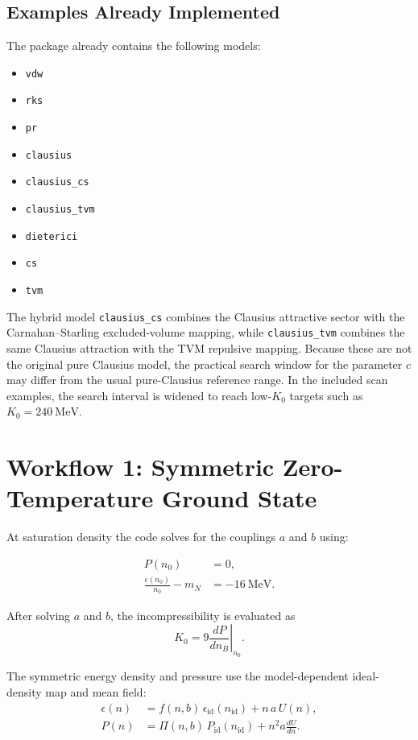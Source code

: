 \documentclass[11pt]{article}
\begin{document}
\subsection{Examples Already Implemented}

The package already contains the following models:

\begin{itemize}
\item \texttt{vdw}
\item \texttt{rks}
\item \texttt{pr}
\item \texttt{clausius}
\item \texttt{clausius\_cs}
\item \texttt{clausius\_tvm}
\item \texttt{dieterici}
\item \texttt{cs}
\item \texttt{tvm}
\end{itemize}

The hybrid model \texttt{clausius\_cs} combines the Clausius attractive sector
with the Carnahan--Starling excluded-volume mapping, while
\texttt{clausius\_tvm} combines the same Clausius attraction with the TVM
repulsive mapping.  Because these are not the original pure Clausius model,
the practical search window for the parameter $c$ may differ from the usual
pure-Clausius reference range.  In the included scan examples, the search
interval is widened to reach low-$K_0$ targets such as
$K_0=240~\mathrm{MeV}$.

\section{Workflow 1: Symmetric Zero-Temperature Ground State}

At saturation density the code solves for the couplings $a$ and $b$ using:

\begin{align}
P(n_0) &= 0, \\
\frac{\epsilon(n_0)}{n_0} - m_N &= -16~\mathrm{MeV}.
\end{align}

After solving $a$ and $b$, the incompressibility is evaluated as
\begin{equation}
K_0 = 9 \left. \frac{dP}{dn_B} \right|_{n_0}.
\end{equation}

The symmetric energy density and pressure use the model-dependent ideal-density
map and mean field:
\begin{align}
\epsilon(n) &= f(n,b)\,\epsilon_{\mathrm{id}}(n_{\mathrm{id}}) + n\,a\,U(n), \\
P(n) &= \Pi(n,b)\,P_{\mathrm{id}}(n_{\mathrm{id}}) + n^2 a \frac{dU}{dn}.
\end{align}
\end{document}
